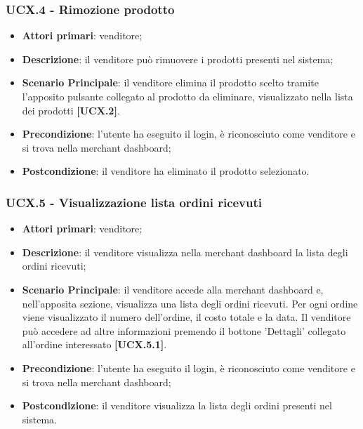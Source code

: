 \subsubsection{UCX.4 - Rimozione prodotto}
\begin{itemize}
\item \textbf{Attori primari}: venditore;
\item \textbf{Descrizione}: il venditore può rimuovere i prodotti presenti nel sistema;
\item \textbf{Scenario Principale}: il venditore elimina il prodotto scelto tramite l'apposito pulsante collegato al prodotto da eliminare, visualizzato nella lista dei prodotti \textbf{[UCX.2]}.
\item \textbf{Precondizione}: l'utente ha eseguito il login, è riconosciuto come venditore e si trova nella merchant dashboard;
\item \textbf{Postcondizione}: il venditore ha eliminato il prodotto selezionato.
\end{itemize}

\subsubsection{UCX.5 - Visualizzazione lista ordini ricevuti}
\begin{itemize}
\item \textbf{Attori primari}: venditore;
\item \textbf{Descrizione}: il venditore visualizza nella merchant dashboard la lista degli ordini ricevuti;
\item \textbf{Scenario Principale}: il venditore accede alla merchant dashboard e, nell'apposita sezione, visualizza una lista degli ordini ricevuti. Per ogni ordine viene visualizzato il numero dell'ordine, il costo totale e la data. Il venditore può accedere ad altre informazioni premendo il bottone 'Dettagli' collegato all'ordine interessato \textbf{[UCX.5.1]}.
\item \textbf{Precondizione}: l'utente ha eseguito il login, è riconosciuto come venditore e si trova nella merchant dashboard;
\item \textbf{Postcondizione}: il venditore visualizza la lista degli ordini presenti nel sistema.
\end{itemize}

